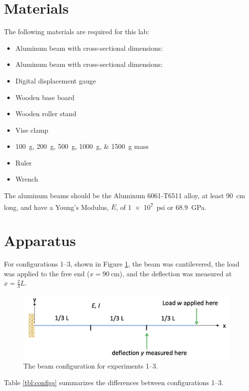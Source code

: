 \documentclass[12 pt]{article}
\begin{document}
\section{Materials} \label{materials}
The following materials are required for this lab:

\begin{itemize}
	\item Aluminum beam with cross-sectional dimensions: 
	\item Aluminum beam with cross-sectional dimensions: 
	\item Digital displacement gauge
	\item Wooden base board
	\item Wooden roller stand
	\item Vise clamp
	\item \qtylist{100;200;500;1000;1500}{\g} mass
	\item Ruler
	\item Wrench
\end{itemize}

The aluminum beams should be the Aluminum 6061-T6511 alloy, at least \qty{90}{\cm} long, and have a Young's Modulus, $E$, of \qty{1e7}{psi} or \qty{68.9}{\GPa}.

\section{Apparatus} \label{apparatus}
For configurations 1--3, shown in Figure \ref{fig:config_1-3}, the beam was cantilevered, the load was applied to the free end ($x=\qty{90}{\cm}$), and the deflection was measured at $x=\frac{2}{3}L$.

\begin{figure}[htbp]
\centering
\includegraphics[width=6in]{images/Config 1-3}
\caption{The beam configuration for experiments 1--3.}
\label{fig:config_1-3}
\end{figure}

Table \ref{tbl:configs} summarizes the differences between configurations 1--3.
\end{document}
